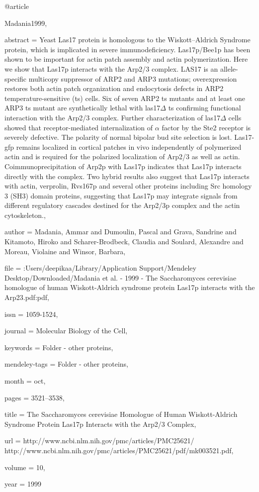 @article{Madania1999,

abstract = {Yeast Las17 protein is homologous to the Wiskott–Aldrich Syndrome protein, which is implicated in severe immunodeficiency. Las17p/Bee1p has been shown to be important for actin patch assembly and actin polymerization. Here we show that Las17p interacts with the Arp2/3 complex. LAS17 is an allele-specific multicopy suppressor of ARP2 and ARP3 mutations; overexpression restores both actin patch organization and endocytosis defects in ARP2 temperature-sensitive (ts) cells. Six of seven ARP2 ts mutants and at least one ARP3 ts mutant are synthetically lethal with las17$\Delta$ ts confirming functional interaction with the Arp2/3 complex. Further characterization of las17$\Delta$ cells showed that receptor-mediated internalization of $\alpha$ factor by the Ste2 receptor is severely defective. The polarity of normal bipolar bud site selection is lost. Las17-gfp remains localized in cortical patches in vivo independently of polymerized actin and is required for the polarized localization of Arp2/3 as well as actin. Coimmunoprecipitation of Arp2p with Las17p indicates that Las17p interacts directly with the complex. Two hybrid results also suggest that Las17p interacts with actin, verprolin, Rvs167p and several other proteins including Src homology 3 (SH3) domain proteins, suggesting that Las17p may integrate signals from different regulatory cascades destined for the Arp2/3p complex and the actin cytoskeleton.},

author = {Madania, Ammar and Dumoulin, Pascal and Grava, Sandrine and Kitamoto, Hiroko and Scharer-Brodbeck, Claudia and Soulard, Alexandre and Moreau, Violaine and Winsor, Barbara},

file = {:Users/deepikaa/Library/Application Support/Mendeley Desktop/Downloaded/Madania et al. - 1999 - The Saccharomyces cerevisiae homologue of human Wiskott-Aldrich syndrome protein Las17p interacts with the Arp23.pdf:pdf},

issn = {1059-1524},

journal = {Molecular Biology of the Cell},

keywords = {Folder - other proteins},

mendeley-tags = {Folder - other proteins},

month = {oct},

pages = {3521--3538},

title = {{The Saccharomyces cerevisiae Homologue of Human Wiskott-Aldrich Syndrome Protein Las17p Interacts with the Arp2/3 Complex}},

url = {http://www.ncbi.nlm.nih.gov/pmc/articles/PMC25621/ http://www.ncbi.nlm.nih.gov/pmc/articles/PMC25621/pdf/mk003521.pdf},

volume = {10},

year = {1999}

}

